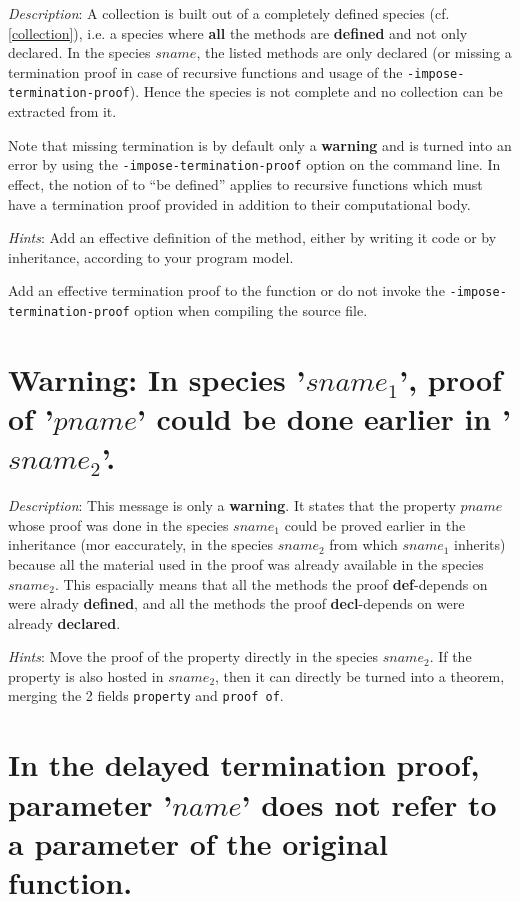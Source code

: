 {\em Description}: A collection is built  out of a  completely defined species
(cf. \ref{collection}), i.e. a species where {\bf all} the methods
are {\bf defined} and not only declared. In the species $sname$, the
listed methods are only declared (or missing a termination proof in case of
recursive functions and usage of the {\tt -impose-termination-proof}).
Hence the species is not complete and no collection can be extracted
from it.

Note that missing termination is by default only a {\bf warning} and
is turned into an error by using the {\tt -impose-termination-proof}
option on the command line. In effect, the notion of to ``be defined''
applies to recursive functions which must have a termination proof
provided in addition to their computational body.

{\em Hints}: Add an effective definition of the method, either by
writing it code or by inheritance, according to your program model.

Add an effective termination proof to the function or do
not invoke the {\tt -impose-termination-proof} option when compiling
the source file.



\section*{Warning: In species '$sname_1$', proof of '$pname$' could be done
  earlier in '$sname_2$'.}

{\em Description}: This message is only a {\bf warning}. It states
that the property $pname$ whose proof was done in the species
$sname_1$ could be proved earlier in the inheritance (mor eaccurately,
in the species $sname_2$ from which $sname_1$ inherits) because all
the material used in the proof was already available in the species
$sname_2$. This espacially means that all the methods the proof
{\bf def}-depends on were alrady {\bf defined}, and all the methods
the proof {\bf decl}-depends on were already {\bf declared}.

{\em Hints}: Move the proof of the property directly in the species
$sname_2$. If the property is also hosted in $sname_2$, then it can
directly be turned into a theorem, merging the 2 fields {\tt property}
and {\tt proof of}.



\section*{In the delayed termination proof, parameter '$name$' does
  not refer to a parameter of the original function.}

